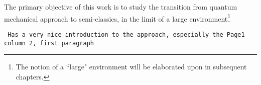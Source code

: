 The primary objective of this work is to study the transition from quantum mechanical approach to semi-classics, in the limit of a 
large environment\footnote{The notion of a ``large" environment will be elaborated upon
in subsequent chapters.}


\texttt{\cite{Mendes_2019} Has a very nice introduction to the approach, especially the Page1 column 2, first paragraph}

\newpage